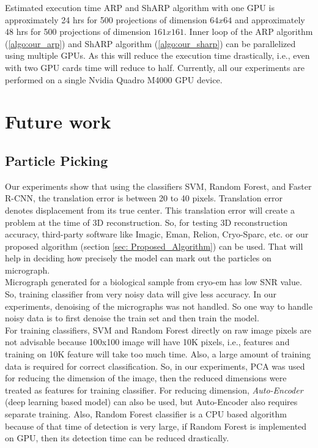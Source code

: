 \documentclass[twoside]{iitbreport}
\begin{document}
Estimated execution time ARP and ShARP algorithm with one GPU is approximately 24 hrs for 500 projections of dimension $64x64$ and approximately 48 hrs for 500 projections of dimension $161x161$. Inner loop of the ARP algorithm (\ref{algo:our_arp}) and ShARP algorithm (\ref{algo:our_sharp}) can be parallelized using multiple GPUs. As this will reduce the execution time drastically, i.e., even with two GPU cards time will reduce to half. Currently, all our experiments are performed on a single Nvidia Quadro M4000 GPU device. 

\chapter{Future work}

\section{Particle Picking}
Our experiments show that using the classifiers SVM, Random Forest, and Faster R-CNN, the translation error is between 20 to 40 pixels. Translation error denotes displacement from its true center. This translation error will create a problem at the time of 3D reconstruction. So, for testing 3D reconstruction accuracy, third-party software like Imagic, Eman, Relion, Cryo-Sparc, etc. or our proposed algorithm (section \ref{sec: Proposed_Algorithm}) can be used. That will help in deciding how precisely the model can mark out the particles on micrograph.\\

 Micrograph generated for a biological sample from cryo-em has low SNR value. So, training classifier from very noisy data will give less accuracy. In our experiments, denoising of the micrographs was not handled.  So one way to handle noisy data is to first denoise the train set and then train the model.\\

For training classifiers, SVM and Random Forest directly on raw image pixels are not advisable because 100x100 image will have 10K pixels, i.e., features and training on 10K feature will take too much time. Also, a large amount of training data is required for correct classification. So, in our experiments, PCA was used for reducing the dimension of the image, then the reduced dimensions were treated as features for training classifier. For reducing dimension, \textit{Auto-Encoder}  (deep learning based model) \cite{meng2017relational} can also be used, but Auto-Encoder also requires separate training. Also, Random Forest classifier is a CPU based algorithm because of that time of detection is very large, if Random Forest is implemented on GPU, then its detection time can be reduced drastically.\\
\end{document}
